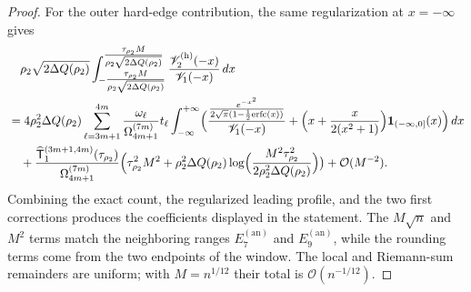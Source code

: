 \documentclass[a4paper]{article}
\newcommand{\erfc}{{\rm erfc}}
\numberwithin{equation}{section}
\begin{document}
\begin{proof}

For the outer hard-edge contribution, the same regularization at
$x=-\infty$ gives
\begin{align*}
&\quad 
\rho_2\sqrt{2\Delta Q(\rho_2)}
\int_{-\tfrac{\tau_{\rho_2}M}{\rho_2\sqrt{2\Delta Q(\rho_2)}}}^{\tfrac{\tau_{\rho_2}M}{\rho_2\sqrt{2\Delta Q(\rho_2)}}}
\frac{\mathscr{V}_2^{(\mathrm{h})}(-x)}{\mathscr{V}_1( -x)}\,dx  
\\
&=
4\rho_2^2\Delta Q(\rho_2)
\sum_{\ell=3m+1}^{4m}
\frac{\omega_{\ell}}{\Omega_{4m+1}^{(7m)}}t_{\ell}
\int_{-\infty}^{+\infty}
\Bigl( 
\frac{\frac{e^{-x^2}}{2\sqrt{\pi}(1-\frac{1}{2}\erfc(x))}}{\mathscr{V}_1(-x)}
+
\Bigl(x+\frac{x}{2(x^2+1)}\Bigr)\mathbf{1}_{(-\infty,0]}(x)
\Bigr)\,dx
\\
&\quad
+\frac{\widehat{\mathsf{T}}_1^{(3m+1,4m)}(\tau_{\rho_2})}{\Omega_{4m+1}^{(7m)}}
\Bigl( 
\tau_{\rho_2}^2M^2
+\rho_2^2\Delta Q(\rho_2)\log \Bigl(\frac{M^2\tau_{\rho_2}^2}{2\rho_2^2\Delta Q(\rho_2)}\Bigr)
\bigr)
+\mathcal{O}(M^{-2}).
\end{align*}
Combining the exact count, the regularized leading profile, and the two first
corrections produces the coefficients displayed in the statement.  The
$M\sqrt n$ and $M^2$ terms match the neighboring ranges $E_7^{(\mathrm{an})}$
and $E_9^{(\mathrm{an})}$, while the rounding terms come from the two endpoints
of the window.  The local and Riemann-sum remainders are uniform; with
$M=n^{1/12}$ their total is $\mathcal O(n^{-1/12})$.

\end{proof}
\end{document}
